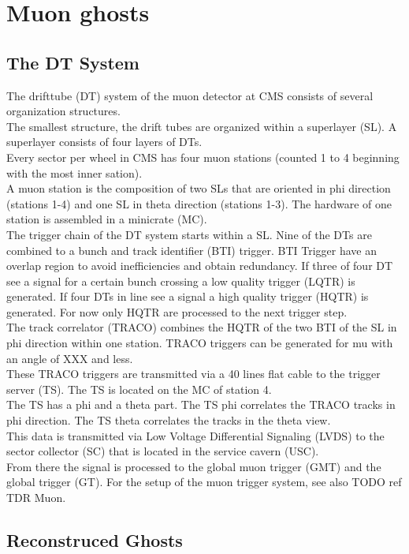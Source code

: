 \section{Muon ghosts}
\subsection{The DT System}
\label{DTSystem}
The drifttube (DT) system of the muon detector at CMS consists of several organization structures.\\
The smallest structure, the drift tubes are organized within a superlayer (SL). A superlayer consists of four layers of DTs.\\
Every sector per wheel in CMS has four muon stations (counted 1 to 4 beginning with the most inner sation).\\
A muon station is the composition of two SLs that are oriented in phi direction (stations 1-4) and one SL in theta direction (stations 1-3). The hardware of one station is assembled in a minicrate (MC).\\
The trigger chain of the DT system starts within a SL. Nine of the DTs are combined to a bunch and track identifier (BTI) trigger. BTI Trigger have an overlap region to avoid inefficiencies and obtain redundancy. If three of four DT see a signal for a certain bunch crossing a low quality trigger (LQTR) is generated. If four DTs in line see a signal a high quality trigger (HQTR) is generated. For now only HQTR are processed to the next trigger step.\\
The track correlator (TRACO) combines the HQTR of the two BTI of the SL in phi direction within one station. TRACO triggers can be generated for mu with an angle of XXX and less.\\
These TRACO triggers are transmitted via a 40 lines flat cable to the trigger server (TS). The TS is located on the MC of station 4.\\
The TS has a phi and a theta part. The TS phi correlates the TRACO tracks in phi direction. The TS theta correlates the tracks in the theta view.\\
This data is transmitted via Low Voltage Differential Signaling (LVDS) to the sector collector (SC) that is located in the service cavern (USC).\\
From there the signal is processed to the global muon trigger (GMT) and the global trigger (GT).
For the setup of the muon trigger system, see also TODO ref TDR Muon.
\subsection{Reconstruced Ghosts}
